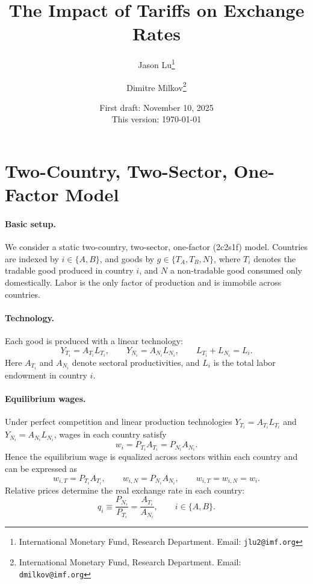 \documentclass[11pt]{article}
\title{The Impact of Tariffs on Exchange Rates}
\author{
Jason Lu\thanks{International Monetary Fund, Research Department. Email: {\tt jlu2@imf.org}} 
\and 
Dimitre Milkov\thanks{International Monetary Fund, Research Department. Email: {\tt dmilkov@imf.org}}
}
\date{First draft: November 10, 2025 \\ This version: \today}
\begin{document}
\maketitle

\section*{Two-Country, Two-Sector, One-Factor Model}

\paragraph{Basic setup.}
We consider a static two-country, two-sector, one-factor (2c2s1f) model. Countries are indexed by $i \in \{A,B\}$, and goods by $g \in \{T_A, T_B, N\}$, where $T_i$ denotes the tradable good produced in country $i$, and $N$ a non-tradable good consumed only domestically. Labor is the only factor of production and is immobile across countries.

\paragraph{Technology.}
Each good is produced with a linear technology:
\begin{equation}
Y_{T_i} = A_{T_i} L_{T_i}, \qquad 
Y_{N_i} = A_{N_i} L_{N_i}, \qquad
L_{T_i} + L_{N_i} = L_i.
\end{equation}
Here $A_{T_i}$ and $A_{N_i}$ denote sectoral productivities, and $L_i$ is the total labor endowment in country $i$.

\paragraph{Equilibrium wages.}
Under perfect competition and linear production technologies 
$Y_{T_i} = A_{T_i} L_{T_i}$ and $Y_{N_i} = A_{N_i} L_{N_i}$, 
wages in each country satisfy
\begin{equation}
w_i = P_{T_i} A_{T_i} = P_{N_i} A_{N_i}.
\label{eq:wage}
\end{equation}
Hence the equilibrium wage is equalized across sectors within each country and can be expressed as
\[
w_{i,T} = P_{T_i} A_{T_i}, \qquad 
w_{i,N} = P_{N_i} A_{N_i}, \qquad 
w_{i,T} = w_{i,N} = w_i.
\]
Relative prices determine the real exchange rate in each country:
\begin{equation}
q_i \equiv \frac{P_{N_i}}{P_{T_i}} = \frac{A_{T_i}}{A_{N_i}}, 
\qquad i \in \{A, B\}.
\label{eq:real_exchange_rate}
\end{equation}
\end{document}
